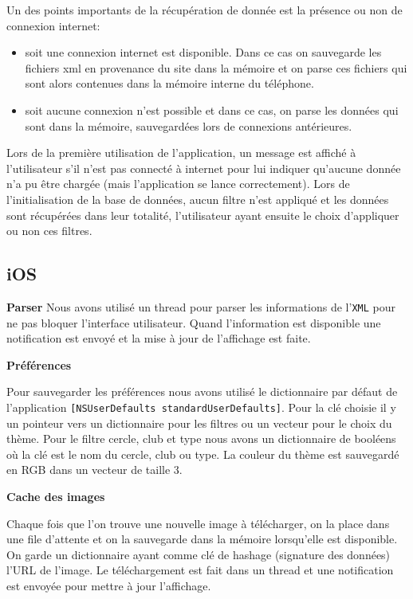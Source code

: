 \documentclass[a4paper, 11px]{article}
\begin{document}
\vspace{0.5cm}
\noindent Un des points importants de la récupération de donnée est la présence ou non de connexion internet: 
\begin{itemize}
\item soit une connexion internet est disponible. Dans ce cas on sauvegarde les fichiers xml en provenance du site dans la mémoire et on parse ces fichiers qui sont alors contenues dans la mémoire interne du téléphone.
\item soit aucune connexion n'est possible et dans ce cas, on parse les données qui sont dans la mémoire, sauvegardées lors de connexions antérieures.\\
\end{itemize}

\noindent Lors de la première utilisation de l'application, un message est affiché à l'utilisateur s'il n'est pas connecté à internet pour lui indiquer qu'aucune donnée n'a pu être chargée (mais l'application se lance correctement).
 Lors de l'initialisation de la base de données, aucun filtre n'est appliqué et les données sont récupérées dans leur totalité, l'utilisateur ayant ensuite le choix d'appliquer ou non ces filtres.

\subsection{iOS}
{\bf Parser}
Nous avons utilisé un thread pour parser les informations de l'\texttt{XML} pour ne pas bloquer l'interface utilisateur. Quand l'information est disponible une notification est envoyé et la mise à jour de l'affichage est faite.


{\bf Préférences}

Pour sauvegarder les préférences nous avons utilisé le dictionnaire par défaut de l'application 
\texttt{[NSUserDefaults standardUserDefaults]}. Pour la clé choisie il y un pointeur vers un dictionnaire pour les filtres ou un vecteur pour le choix du thème. Pour le filtre cercle, club et type nous avons un dictionnaire de booléens où la clé est le nom du cercle, club ou type. La couleur du thème est sauvegardé en RGB dans un vecteur de taille 3. 
 
{\bf Cache des images}

Chaque fois que l'on trouve une nouvelle image à télécharger, on la place dans une file d'attente et on la sauvegarde dans la mémoire lorsqu'elle est disponible. On garde un dictionnaire ayant comme clé de hashage (signature des données) l'URL de l'image. Le téléchargement est fait dans un thread et une notification est envoyée pour mettre à jour l'affichage.
\end{document}
